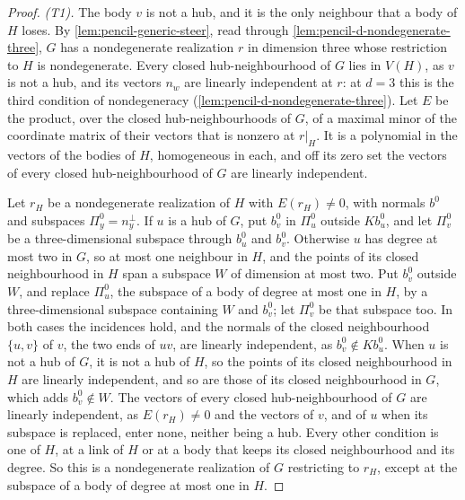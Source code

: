 \begin{proof}
  \leanok
  \emph{(T1).} The body $v$ is not a hub, and it is the only neighbour
  that a body of $H$ loses. By \cref{lem:pencil-generic-steer}, read
  through \cref{lem:pencil-d-nondegenerate-three}, $G$ has a nondegenerate
  realization $r$ in dimension three whose restriction to $H$ is
  nondegenerate. Every closed hub-neighbourhood of $G$ lies in $V(H)$, as
  $v$ is not a hub, and its vectors $n_w$ are linearly independent at $r$:
  at $d = 3$ this is the third condition of nondegeneracy
  (\cref{lem:pencil-d-nondegenerate-three}). Let $E$ be the product, over
  the closed hub-neighbourhoods of $G$, of a maximal minor of the
  coordinate matrix of their vectors that is nonzero at $r|_H$. It is a
  polynomial in the vectors of the bodies of $H$, homogeneous in each,
  and off its zero set the vectors of every closed hub-neighbourhood of
  $G$ are linearly independent.

  Let $r_H$ be a nondegenerate realization of $H$ with $E(r_H) \ne 0$, with
  normals $b^0$ and subspaces $\Pi^0_y = n_y^{\perp}$. If $u$ is a hub of
  $G$, put $b^0_v$ in $\Pi^0_u$ outside $K b^0_u$, and let $\Pi^0_v$ be a
  three-dimensional subspace through $b^0_u$ and $b^0_v$. Otherwise $u$
  has degree at most two in $G$, so at most one neighbour in $H$, and the
  points of its closed neighbourhood in $H$ span a subspace $W$ of
  dimension at most two. Put $b^0_v$ outside $W$, and replace $\Pi^0_u$,
  the subspace of a body of degree at most one in $H$, by a
  three-dimensional subspace containing $W$ and $b^0_v$; let $\Pi^0_v$ be
  that subspace too. In both cases the incidences hold, and the normals of
  the closed neighbourhood $\{u, v\}$ of $v$, the two ends of $uv$, are
  linearly independent, as $b^0_v \notin K b^0_u$. When $u$ is not a hub
  of $G$, it is not a hub of $H$, so the points of its closed
  neighbourhood in $H$ are linearly independent, and so are those of its
  closed neighbourhood in $G$, which adds $b^0_v \notin W$. The vectors of
  every closed hub-neighbourhood of $G$ are linearly independent, as
  $E(r_H) \ne 0$ and the vectors of $v$, and of $u$ when its subspace is
  replaced, enter none, neither being a hub. Every other condition is one
  of $H$, at a link of $H$ or at a body that keeps its closed
  neighbourhood and its degree. So this is a nondegenerate realization of
  $G$ restricting to $r_H$, except at the subspace of a body of degree at
  most one in $H$.


\end{proof}
